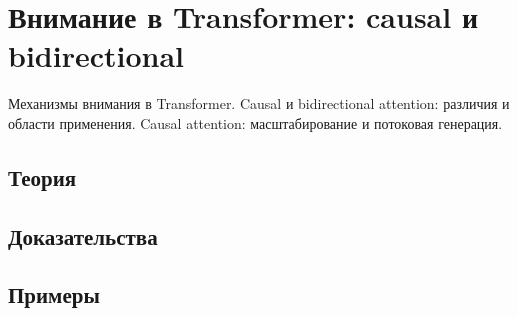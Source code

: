 
\section{Внимание в Transformer: causal и bidirectional}
\label{sec:2.5.04-transformer-attention}

\begin{ticket}
Механизмы внимания в Transformer. Causal и bidirectional attention: различия и области применения. Causal attention: масштабирование и потоковая генерация.
\end{ticket}

\subsection*{Теория}

\subsection*{Доказательства}

\subsection*{Примеры}
